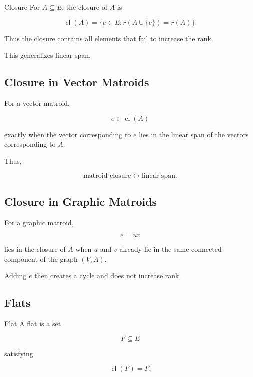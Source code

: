 \begin{definitionbox}{Closure}
For \(A\subseteq E\), the closure of \(A\) is

\[
\boxed{
\operatorname{cl}(A)
=
\{
e\in E:
r(A\cup\{e\})=r(A)
\}.
}
\]
\end{definitionbox}

Thus the closure contains all elements that fail to increase the rank.

This generalizes linear span.

\subsection{Closure in Vector Matroids}
\label{subsec:closure-vector-matroid}

For a vector matroid,

\[
e\in\operatorname{cl}(A)
\]

exactly when the vector corresponding to \(e\) lies in the linear span
of the vectors corresponding to \(A\).

Thus,

\[
\boxed{
\text{matroid closure}
\longleftrightarrow
\text{linear span}.
}
\]

\subsection{Closure in Graphic Matroids}
\label{subsec:closure-graphic-matroid}

For a graphic matroid,

\[
e=uv
\]

lies in the closure of \(A\) when \(u\) and \(v\) already lie in the
same connected component of the graph \((V,A)\).

Adding \(e\) then creates a cycle and does not increase rank.

\subsection{Flats}
\label{subsec:matroid-flats}

\begin{definitionbox}{Flat}
A flat is a set

\[
F\subseteq E
\]

satisfying

\[
\boxed{
\operatorname{cl}(F)=F.
}
\]
\end{definitionbox}

